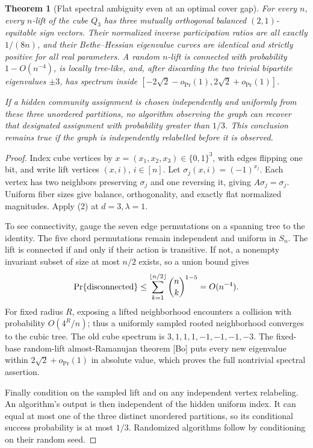 \documentclass[11pt]{article}
\newtheorem{theorem}{Theorem}
\begin{document}
\begin{theorem}[Flat spectral ambiguity even at an optimal cover gap]
For every $n$, every $n$-lift of the cube $Q_3$ has three mutually
orthogonal balanced $(2,1)$-equitable sign vectors. Their normalized
inverse participation ratios are all exactly $1/(8n)$, and their
Bethe--Hessian eigenvalue curves are identical and strictly positive for
all real parameters. A random $n$-lift is connected with probability
$1-O(n^{-4})$, is locally tree-like, and, after discarding the two
trivial bipartite eigenvalues $\pm3$, has spectrum inside
$[-2\sqrt2-o_{\Pr}(1),2\sqrt2+o_{\Pr}(1)]$.

If a hidden community assignment is chosen independently and uniformly
from these three unordered partitions, no algorithm observing the graph
can recover that designated assignment with probability greater than
$1/3$. This conclusion remains true if the graph is independently
relabelled before it is observed.
\end{theorem}
\begin{proof}
Index cube vertices by $x=(x_1,x_2,x_3)\in\{0,1\}^3$, with edges
flipping one bit, and write lift vertices $(x,i)$, $i\in[n]$. Let
$\sigma_j(x,i)=(-1)^{x_j}$. Each vertex has two neighbors preserving
$\sigma_j$ and one reversing it, giving $A\sigma_j=\sigma_j$.
Uniform fiber sizes give balance, orthogonality, and exactly flat
normalized magnitudes. Apply (2) at $d=3,\lambda=1$.

To see connectivity, gauge the seven edge permutations on a spanning
tree to the identity. The five chord permutations remain independent
and uniform in $S_n$. The lift is connected if and only if their action
is transitive. If not, a nonempty invariant subset of size at most $n/2$
exists, so a union bound gives
\[
 \Pr\{\hbox{disconnected}\}
 \leq\sum_{k=1}^{\lfloor n/2\rfloor}\binom nk^{1-5}
 =O(n^{-4}).
\]
For fixed radius $R$, exposing a lifted neighborhood encounters a
collision with probability $O(4^R/n)$; thus a uniformly sampled rooted
neighborhood converges to the cubic tree. The old cube spectrum is
$3,1,1,1,-1,-1,-1,-3$. The fixed-base random-lift almost-Ramanujan theorem
[Bo] puts every new eigenvalue within $2\sqrt2+o_{\Pr}(1)$ in absolute
value, which proves the full nontrivial spectral assertion.

Finally condition on the sampled lift and on any independent vertex
relabeling. An algorithm's output is then independent of the hidden
uniform index. It can equal at most one of the three distinct unordered
partitions, so its conditional success probability is at most $1/3$.
Randomized algorithms follow by conditioning on their random seed.
\end{proof}
\end{document}
